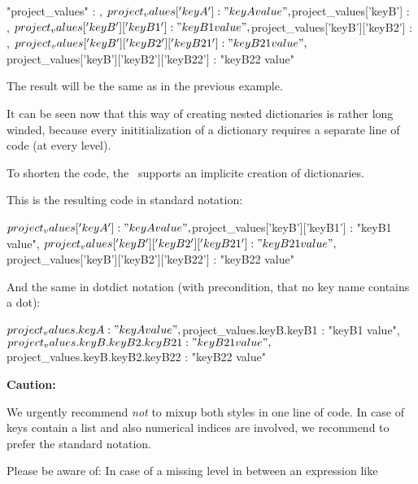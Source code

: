 \begin{pythoncode}
{
   "project_values" : {},
   ${project_values}['keyA'] : "keyA value",
   ${project_values}['keyB'] : {},
   ${project_values}['keyB']['keyB1'] : "keyB1 value",
   ${project_values}['keyB']['keyB2'] : {},
   ${project_values}['keyB']['keyB2']['keyB21'] : "keyB21 value",
   ${project_values}['keyB']['keyB2']['keyB22'] : "keyB22 value"
}
\end{pythoncode}

The result will be the same as in the previous example.

It can be seen now that this way of creating nested dictionaries is rather long winded, because every inititialization of a dictionary
requires a separate line of code (at every level).

To shorten the code, the \pkg\ supports an implicite creation of dictionaries.

This is the resulting code in standard notation:

\begin{pythoncode}
{
   ${project_values}['keyA'] : "keyA value",
   ${project_values}['keyB']['keyB1'] : "keyB1 value",
   ${project_values}['keyB']['keyB2']['keyB21'] : "keyB21 value",
   ${project_values}['keyB']['keyB2']['keyB22'] : "keyB22 value"
}
\end{pythoncode}

\vspace{2ex}

And the same in dotdict notation (with precondition, that no key name contains a dot):

\begin{pythoncode}
{
   ${project_values.keyA} : "keyA value",
   ${project_values.keyB.keyB1} : "keyB1 value",
   ${project_values.keyB.keyB2.keyB21} : "keyB21 value",
   ${project_values.keyB.keyB2.keyB22} : "keyB22 value"
}
\end{pythoncode}

\vspace{2ex}

\textbf{Caution:}

We urgently recommend \textit{not} to mixup both styles in one line of code. In case of keys contain a list and also numerical indices are involved,
we recommend to prefer the standard notation. 

Please be aware of: In case of a missing level in between an expression like 


